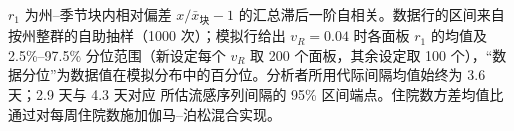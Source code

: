 \begin{table}[htbp]
\begin{tabular}{lllll}
\bottomrule
\end{tabular}
\par\smallskip
\begin{minipage}{0.95\linewidth}\scriptsize $r_1$ 为州--季节块内相对偏差 $x/\bar{x}_{\text{块}}-1$ 的汇总滞后一阶自相关。数据行的区间来自按州整群的自助抽样（1000 次）；模拟行给出 $v_R=0.04$ 时各面板 $r_1$ 的均值及 2.5\%--97.5\% 分位范围（新设定每个 $v_R$ 取 200 个面板，其余设定取 100 个），“数据分位”为数据值在模拟分布中的百分位。分析者所用代际间隔均值始终为 3.6 天；2.9 天与 4.3 天对应 \citet{cowling2009estimation} 所估流感序列间隔的 95\% 区间端点。住院数方差均值比通过对每周住院数施加伽马--泊松混合实现。\end{minipage}
\end{table}
